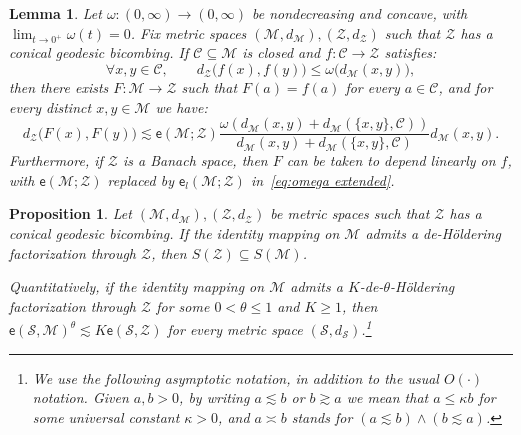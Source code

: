 \documentclass[10pt,a4paper]{amsart}
\newtheorem{prop}{Proposition}
\newtheorem{lemma}{Lemma}
\newcommand{\MM}{\mathcal{M}}
\renewcommand{\SS}{\mathscr{S}}
\newcommand{\cZ}{\mathcal{Z}}
\newcommand{\ee}{\mathsf{e}}
\renewcommand{\ge}{\geqslant}
\renewcommand{\le}{\leqslant}
\newcommand{\sub}{\mathscr{C}}
\renewcommand{\subset}{\subseteq}
\begin{document}
\begin{lemma}\label{lem:two scales} Let $\omega:(0,\infty)\to (0,\infty)$ be nondecreasing and concave, with $\lim_{t\to 0^+}\omega(t)=0$. Fix  metric spaces $(\MM,d_\MM), (\cZ,d_\cZ)$ such that $\cZ$ has a conical geodesic bicombing. If $\sub\subset \MM$ is closed and $f:\sub\to \cZ$ satisfies:
\begin{equation}\label{eq:omega modulus}
\forall x,y\in \sub,\qquad d_\cZ\big(f(x),f(y)\big)\le \omega \big(d_\MM(x,y)\big),
\end{equation}
then there exists $F:\MM\to \cZ$ such that $F(a)=f(a)$ for every $a\in \sub$,  and for every distinct $x,y\in \MM$ we have:
\begin{equation}\label{eq:omega extended}
d_\cZ\big(F(x),F(y)\big)\lesssim \ee(\MM;\cZ)\frac{\omega\left(d_\MM(x,y)+d_\MM(\{x,y\},\sub)\right)}{d_\MM(x,y)+d_\MM(\{x,y\},\sub)}d_\MM(x,y).
\end{equation}
Furthermore, if $\cZ$ is a Banach space, then $F$ can be taken to depend linearly on $f$, with $\ee(\MM;\cZ)$ replaced by $\ee_l(\MM;\cZ)$ in~\eqref{eq:omega extended}.  
\end{lemma}

\begin{prop}\label{prop:def to ext} Let $(\MM,d_\MM), (\cZ,d_\cZ)$ be metric spaces such that $\cZ$ has a conical geodesic bicombing. If the identity mapping  on $\MM$  admits a de-H\"oldering factorization through $\cZ$, then   $S(\cZ)\subset S(\MM)$. 

Quantitatively, if the identity mapping on $\MM$ admits  a $K$-de-$\theta$-H\"oldering factorization through  $\cZ$ for some $0<\theta\le 1$ and $K\ge 1$, then $\ee(\SS,\MM)^\theta\lesssim K\ee(\SS,\cZ)$ for every metric space $(\SS,d_\SS)$.\footnote{We use the following  asymptotic notation, in addition to  the usual $O(\cdot)$ notation. Given $a,b>0$, by writing
$a\lesssim b$ or $b\gtrsim a$ we mean that $a\le \kappa b$ for some
universal constant $\kappa>0$, and $a\asymp b$
stands for $(a\lesssim b) \wedge  (b\lesssim a)$. }
\end{prop}
\end{document}

